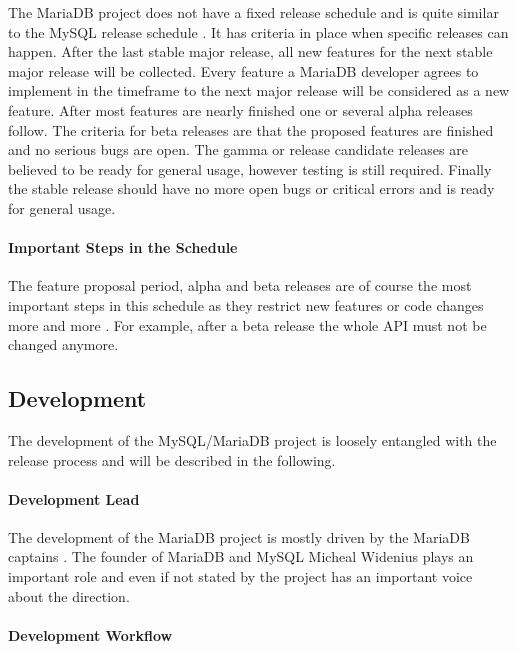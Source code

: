 The MariaDB project does not have a fixed release schedule and is quite similar
to the MySQL release schedule
\cite{MySQLReleaseCriteria,MySQLRoadmap,MySQLPlans}. It has criteria in place
when specific releases can happen. After the last stable major release, all new
features for the next stable major release will be collected. Every feature a
MariaDB developer agrees to implement in the timeframe to the next major
release will be considered as a new feature. After most features are nearly
finished one or several alpha releases follow. The criteria for beta releases
are that the proposed features are finished and no serious bugs are open. The
gamma or release candidate releases are believed to be ready for general usage,
however testing is still required. Finally the stable release should have no
more open bugs or critical errors and is ready for general usage.

\paragraph{Important Steps in the Schedule}

The feature proposal period, alpha and beta releases are of course the most
important steps in this schedule as they restrict new features or code changes
more and more \cite{MySQLReleaseCriteria}. For example, after a beta release
the whole API must not be changed anymore.

\subsection{Development}

The development of the MySQL/MariaDB project is loosely entangled with the
release process and will be described in the following.

\paragraph{Development Lead}

The development of the MariaDB project is mostly driven by the MariaDB captains
\cite{MySQLContributing,MySQLDevelopers}. The founder of MariaDB and MySQL
Micheal Widenius plays an important role and even if not stated by the project
has an important voice about the direction.

\paragraph{Development Workflow}


